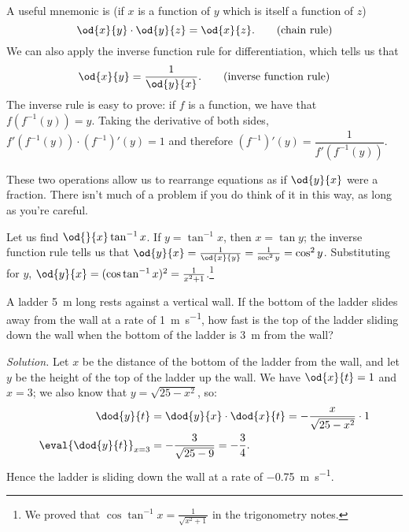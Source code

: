 A useful mnemonic is (if $ x $ is a function of $ y $ which is itself a function of $ z $)
\begin{equation}
  \od{x}{y} \cdot \od{y}{z} = \od{x}{z}. \tag{chain rule}
\end{equation}
We can also apply the inverse function rule for differentiation, which tells us that
\begin{equation}
  \od{x}{y} = \frac{1}{\od{y}{x}}. \tag{inverse function rule}
\end{equation}
The inverse rule is easy to prove: if $ f $ is a function, we have that $ f(f^{-1}(y)) = y $. Taking the derivative of
both sides, $ f'(f^{-1}(y)) \cdot (f^{-1})'(y) = 1 $ and therefore $ (f^{-1})'(y) = \dfrac{1}{f'(f^{-1}(y))} $.

These two operations allow us to rearrange equations as if $ \od{y}{x} $ were a fraction. There isn't much of a problem
if you do think of it in this way, as long as you're careful.

\begin{ex}
  Let us find $ \od{}{x} \tan^{-1} x $. If $ y = \tan^{-1} x $, then $ x = \tan y $; the inverse
  function rule tells us that $ \od{y}{x} = \frac{1}{\od{x}{y}} = \frac{1}{\sec^2 y} = \cos^2 y $.
  Substituting for $ y $, $ \od{y}{x} = (\cos \tan^{-1} x)^2 = \frac{1}{x^2 + 1} $.\footnote{We proved
  that $ \cos \tan^{-1} x = \frac{1}{\sqrt{x^2 + 1}} $ in the trigonometry notes.}
\end{ex}

\begin{ex}
  A ladder \SI{5}{\metre} long rests against a vertical wall. If the bottom of the ladder slides away
  from the wall at a rate of \SI{1}{\metre\per\second}, how fast is the top of the ladder sliding down the
  wall when the bottom of the ladder is \SI{3}{\metre} from the wall?

  \textit{Solution.} Let $ x $ be the distance of the bottom of the ladder from the wall, and let $ y $
  be the height of the top of the ladder up the wall. We have $ \od{x}{t} = 1 $ and $ x = 3 $; we also
  know that $ y = \sqrt{25 - x^2} $, so:
  \begin{align*}
    \dod{y}{t} &= \dod{y}{x} \cdot \dod{x}{t} = -\frac{x}{\sqrt{25 - x^2}} \cdot 1\\
    \eval{\dod{y}{t}}_{x = 3} &= -\frac{3}{\sqrt{25 - 9}} = -\frac{3}{4}.
  \end{align*}
  Hence the ladder is sliding down the wall at a rate of \SI{-0.75}{\metre\per\second}.
\end{ex}

